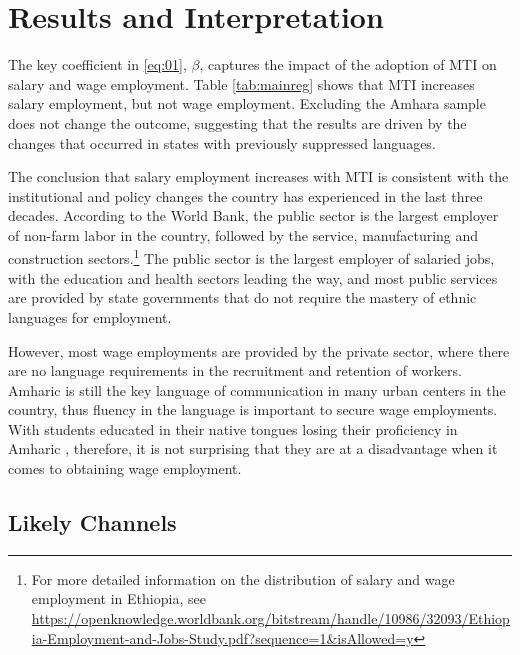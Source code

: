 
\section{Results and Interpretation}
\label{section:results}


The key coefficient in \eqref{eq:01}, $ \beta $, captures the impact of the adoption of MTI on salary and wage employment. Table \ref{tab:mainreg} shows that MTI increases salary employment, but not wage employment. Excluding the Amhara sample does not change the outcome, suggesting that the results are driven by the changes that occurred in states with previously suppressed languages. 

The conclusion that salary employment increases with MTI is consistent with the institutional and policy changes the country has experienced in the last three decades. According to the World Bank, the public sector is the largest employer of non-farm labor in the country, followed by the service, manufacturing and construction sectors.\footnote{For more detailed information on the distribution of salary and wage employment in Ethiopia, see \url{https://openknowledge.worldbank.org/bitstream/handle/10986/32093/Ethiopia-Employment-and-Jobs-Study.pdf?sequence=1&isAllowed=y}} The public sector is the largest employer of salaried jobs, with the education and health sectors leading the way, and most public services are provided by state governments that do not require the mastery of ethnic languages for employment. 


However, most wage employments are provided by the private sector, where there are no language requirements in the recruitment and retention of workers. Amharic is still the key language of communication in many urban centers in the country, thus fluency in the language is important to secure wage employments. With students educated in their native tongues losing their proficiency in Amharic \citep{taye_medium_2019}, therefore, it is not surprising that they are at a disadvantage when it comes to obtaining wage employment.  

\subsection*{Likely Channels}

